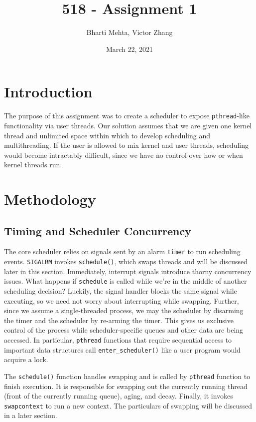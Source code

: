 \documentclass{article}
\title{518 - Assignment 1}
\author{Bharti Mehta, Victor Zhang}
\date{March 22, 2021}
\begin{document}
\maketitle

\section{Introduction}
The purpose of this assignment was to create a scheduler to expose \verb|pthread|-like functionality via user threads. Our solution assumes that we are given one kernel thread and unlimited space within which to develop scheduling and multithreading. If the user is allowed to mix kernel and user threads, scheduling would become intractably difficult, since we have no control over how or when kernel threads run.

\section{Methodology}
\subsection{Timing and Scheduler Concurrency}
The core scheduler relies on signals sent by an alarm \verb|timer| to run scheduling events.
\verb|SIGALRM| invokes \verb|schedule()|, which swaps threads and will be discussed later in this section.
Immediately, interrupt signals introduce thorny concurrency issues.
What happens if \verb|schedule| is called while we're in the middle of another scheduling decision?
Luckily, the signal handler blocks the same signal while executing, so we need not worry about interrupting while swapping.
Further, since we assume a single-threaded process, we may  the scheduler by disarming the timer and  the scheduler by re-arming the timer.
This gives us exclusive control of the process while scheduler-specific queues and other data are being accessed.
In particular, \verb|pthread| functions that require sequential access to important data structures call \verb|enter_scheduler()| like a user program would acquire a lock.

The \verb|schedule()| function handles swapping and is called by \verb|pthread| function to finish execution.
It is responsible for swapping out the currently running thread (front of the currently running queue), aging, and decay.
Finally, it invokes \verb|swapcontext| to run a new context.
The particulars of swapping will be discussed in a later section.
\end{document}
